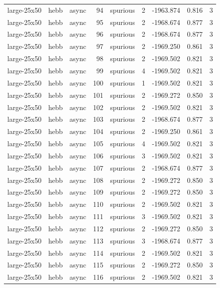 \begin{tabular}{lllrlrrrr}
large-25x50 & hebb & async & 94 & spurious & 2 & -1963.874 & 0.816 & 3 \\
large-25x50 & hebb & async & 95 & spurious & 2 & -1968.674 & 0.877 & 3 \\
large-25x50 & hebb & async & 96 & spurious & 2 & -1968.674 & 0.877 & 3 \\
large-25x50 & hebb & async & 97 & spurious & 2 & -1969.250 & 0.861 & 3 \\
large-25x50 & hebb & async & 98 & spurious & 2 & -1969.502 & 0.821 & 3 \\
large-25x50 & hebb & async & 99 & spurious & 4 & -1969.502 & 0.821 & 3 \\
large-25x50 & hebb & async & 100 & spurious & 1 & -1969.502 & 0.821 & 3 \\
large-25x50 & hebb & async & 101 & spurious & 2 & -1969.272 & 0.850 & 3 \\
large-25x50 & hebb & async & 102 & spurious & 2 & -1969.502 & 0.821 & 3 \\
large-25x50 & hebb & async & 103 & spurious & 2 & -1968.674 & 0.877 & 3 \\
large-25x50 & hebb & async & 104 & spurious & 2 & -1969.250 & 0.861 & 3 \\
large-25x50 & hebb & async & 105 & spurious & 4 & -1969.502 & 0.821 & 3 \\
large-25x50 & hebb & async & 106 & spurious & 3 & -1969.502 & 0.821 & 3 \\
large-25x50 & hebb & async & 107 & spurious & 2 & -1968.674 & 0.877 & 3 \\
large-25x50 & hebb & async & 108 & spurious & 2 & -1969.272 & 0.850 & 3 \\
large-25x50 & hebb & async & 109 & spurious & 2 & -1969.272 & 0.850 & 3 \\
large-25x50 & hebb & async & 110 & spurious & 2 & -1969.502 & 0.821 & 3 \\
large-25x50 & hebb & async & 111 & spurious & 3 & -1969.502 & 0.821 & 3 \\
large-25x50 & hebb & async & 112 & spurious & 2 & -1969.272 & 0.850 & 3 \\
large-25x50 & hebb & async & 113 & spurious & 3 & -1968.674 & 0.877 & 3 \\
large-25x50 & hebb & async & 114 & spurious & 2 & -1969.502 & 0.821 & 3 \\
large-25x50 & hebb & async & 115 & spurious & 2 & -1969.272 & 0.850 & 3 \\
large-25x50 & hebb & async & 116 & spurious & 2 & -1969.502 & 0.821 & 3 \\

\end{tabular}
